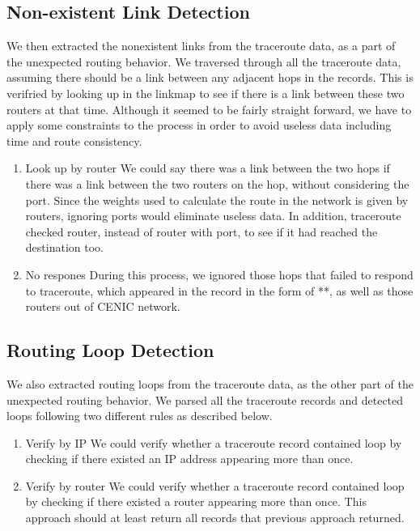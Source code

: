\documentclass[conference, twocolumn, oneside, 10pt]{IEEEtran}
\begin{document}
\subsection{Non-existent Link Detection}
We then extracted the nonexistent links from the traceroute data, as a part of the unexpected routing behavior. We traversed through all the traceroute data, assuming there should be a link between any adjacent hops in the records. This is verifried by looking up in the linkmap to see if there is a link between these two routers at that time. Although it seemed to be fairly straight forward, we have to apply some constraints to the process in order to avoid useless data including time and route consistency.

\begin{enumerate}

\item{Look up by router} We could say there was a link between the two hops if there was a link between the two routers on the hop, without considering the port. Since the weights used to calculate the route in the network is given by routers, ignoring ports would eliminate useless data. In addition, traceroute checked router, instead of router with port, to see if it had reached the destination too. 

\item{No respones} During this process, we ignored those hops that failed to respond to traceroute, which appeared in the record in the form of **, as well as those routers out of CENIC network. 

\end{enumerate}

\subsection{Routing Loop Detection}

We also extracted routing loops from the traceroute data, as the other part of the unexpected routing behavior. We parsed all the traceroute records and detected loops following two different rules as described below.

\begin{enumerate}

\item{Verify by IP} We could verify whether a traceroute record contained loop by checking if there existed an IP address appearing more than once.

\item{Verify by router} We could verify whether a traceroute record contained loop by checking if there existed a router appearing more than once. This approach should at least return all records that previous approach returned.

\end{enumerate}
\end{document}
